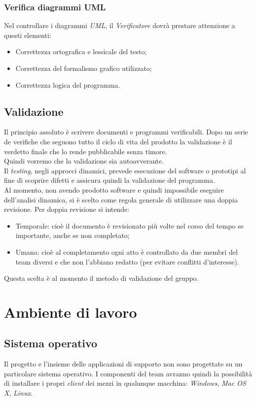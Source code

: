 \documentclass[12pt,a4paper,titlepage]{article}
\begin{document}
\subsubsection{Verifica diagrammi UML}
Nel controllare i diagrammi \textit{UML}, il \textit{Verificatore} dovrà prestare attenzione a questi elementi:
\begin{itemize}
	\item Correttezza ortografica e lessicale del testo;
	\item Correttezza del formalismo grafico utilizzato;
	\item Correttezza logica del programma.
\end{itemize}

\subsection{Validazione}
Il principio assoluto è scrivere documenti e programmi verificabili. Dopo un serie de verifiche che seguono tutto il ciclo di vita del prodotto la validazione è il verdetto finale che lo rende pubblicabile senza timore.\\
Quindi vorremo che la validazione sia  autoavverante. \\
Il \textit{testing}, negli approcci dinamici, prevede esecuzione del software o prototipi al fine di scoprire difetti e assicura quindi la validazione del programma.\\
Al momento, non avendo prodotto software e quindi impossibile eseguire dell'analisi dinamica, si è scelto come regola generale di utilizzare una doppia revisione. Per doppia revisione si intende:
\begin{itemize}
	\item Temporale: cioè il documento è revisionato più volte nel corso del tempo se importante, anche se non completato;
	\item Umana: cioè al completamento ogni atto è controllato da due membri del team diversi e che non l'abbiano redatto (per evitare conflitti d'interesse). 
\end{itemize}
Questa scelta è al momento il metodo di validazione del gruppo.

\newpage

\section{Ambiente di lavoro}
\subsection{Sistema operativo}
Il progetto e l'insieme delle applicazioni di supporto non sono progettate su un particolare sistema operativo. I componenti del team avranno quindi la possibilità di installare i propri \textit{client} dei mezzi in qualunque macchina: \textit{Windows}, \textit{Mac OS X}, \textit{Linux}.
\end{document}
